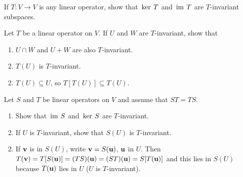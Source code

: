 \begin{multicols}{2}
\begin{ex}\label{ex:ex9_3_1}
If $T : V \to V$ is any linear operator, show that $\thinspace\operatorname{ker \medspace}T$ and $\thinspace\operatorname{im \medspace}T$ are $T$-invariant subspaces.
\end{ex}

\begin{ex}\label{ex:ex9_3_2}
Let $T$ be a linear operator on $V$. If $U$ and $W$ are $T$-invariant, show that


\begin{enumerate}[label={\alph*.}]
\item $U \cap W$ and $U + W$ are also $T$-invariant.

\item $T(U)$ is $T$-invariant.

\end{enumerate}
\begin{sol}
\begin{enumerate}[label={\alph*.}]
\setcounter{enumi}{1}
\item $T(U) \subseteq U$, so $T[T(U)] \subseteq T(U)$.

\end{enumerate}
\end{sol}
\end{ex}

\begin{ex}
Let $S$ and $T$ be linear operators on $V$ and assume that $ST = TS$.


\begin{enumerate}[label={\alph*.}]
\item Show that $\thinspace\operatorname{im \medspace}S$ and $\thinspace\operatorname{ker \medspace}S$ are $T$-invariant.

\item If $U$ is $T$-invariant, show that $S(U)$ is $T$-invariant.

\end{enumerate}
\begin{sol}
\begin{enumerate}[label={\alph*.}]
\setcounter{enumi}{1}
\item If $\textbf{v}$ is in $S(U)$, write $\textbf{v} = S(\textbf{u})$, $\textbf{u}$ in $U$. Then $T(\textbf{v}) = T[S(\textbf{u})] = (TS)(\textbf{u}) = (ST)(\textbf{u}) = S[T(\textbf{u})]$ and this lies in $S(U)$ because $T(\textbf{u})$ lies in $U$ ($U$ is $T$-invariant).

\end{enumerate}
\end{sol}
\end{ex}


\end{multicols}
